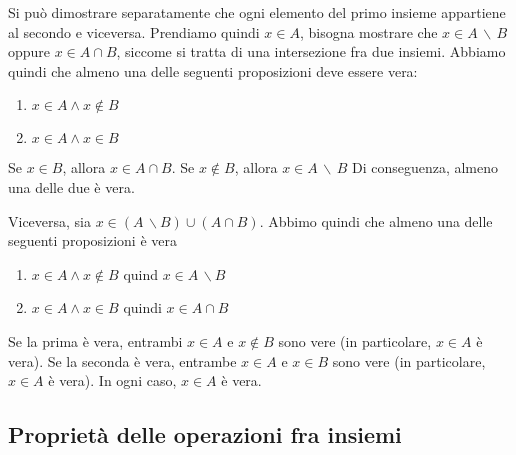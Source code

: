 \documentclass[a4paper]{article}
\begin{document}
Si può dimostrare separatamente che ogni elemento del primo insieme appartiene al secondo e viceversa.
Prendiamo quindi \(x\in A\), bisogna mostrare che
\(x \in A \,\backslash\, B\) oppure \(x \in A \cap B\), siccome si tratta di una intersezione fra due insiemi.
Abbiamo quindi che almeno una delle seguenti proposizioni deve essere vera:
\begin{enumerate}
    \item \(x \in A \land x \notin B\)
    \item \(x \in A \land x \in B\)
\end{enumerate}

Se \(x \in B\), allora \(x \in A \cap B\).
Se \(x \notin B\), allora \(x \in A \,\backslash\, B\)
Di conseguenza, almeno una delle due è vera.

Viceversa, sia \(x \in (A \,\backslash B) \cup (A \cap B)\).
Abbimo quindi che almeno una delle seguenti proposizioni è vera
\begin{enumerate}
    \item \(x \in A \land x \notin B\) quind \(x \in A \,\backslash B\)
    \item \(x \in A \land x \in B\) quindi \(x \in A \cap B\)
\end{enumerate}
Se la prima è vera, entrambi \(x \in A\) e \(x \notin B\) sono vere (in particolare, \(x \in A\) è vera).
Se la seconda è vera, entrambe \(x\in A\) e \(x \in B\) sono vere (in particolare, \(x \in A\) è vera).
In ogni caso, \(x \in A\) è vera.

\pagebreak

\subsection{Proprietà delle operazioni fra insiemi}

\end{document}
